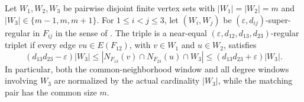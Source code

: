 \begin{definition}
Let $W_1,W_2,W_3$ be pairwise disjoint finite vertex sets with $|W_1|=|W_2|=m$ and $|W_3|\in\{m-1,m,m+1\}$.  For $1\leq i<j\leq3$, let $(W_i,W_j)$ be $(\varepsilon,d_{ij})$-super-regular in $F_{ij}$ in the sense of .  The triple is a near-equal $(\varepsilon,d_{12},d_{13},d_{23})$-regular triplet if every edge $vu\in E(F_{12})$, with $v\in W_1$ and $u\in W_2$, satisfies
\[
 (d_{13}d_{23}-\varepsilon)|W_3|\leq
 |N_{F_{13}}(v)\cap N_{F_{23}}(u)\cap W_3|
 \leq(d_{13}d_{23}+\varepsilon)|W_3|.
\]
In particular, both the common-neighborhood window and all degree windows involving $W_3$ are normalized by the actual cardinality $|W_3|$, while the matching pair has the common size $m$.
\end{definition}
